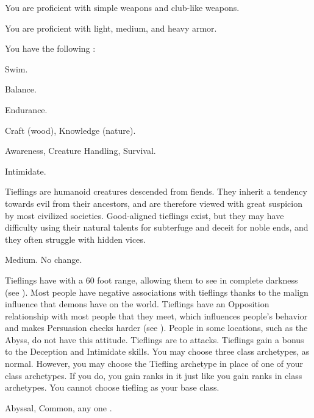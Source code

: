       You are proficient with simple weapons and club-like weapons.

      You are proficient with light, medium, and heavy armor.

      You have the following :
      \begin{raggeditemize}
        \item {} Swim.
        \item {} Balance.
        \item {} Endurance.
        \item {} Craft (wood), Knowledge (nature).
        \item {} Awareness, Creature Handling, Survival.
        \item {} Intimidate.
      \end{raggeditemize}


  Tieflings are humanoid creatures descended from fiends.
  They inherit a tendency towards evil from their ancestors, and are therefore viewed with great suspicion by most civilized societies.
  Good-aligned tieflings exist, but they may have difficulty using their natural talents for subterfuge and deceit for noble ends, and they often struggle with hidden vices.

   Medium.
   No change.
  \begin{raggeditemize}
     Tieflings have  with a 60 foot range, allowing them to see in complete darkness (see ).
     Most people have negative associations with tieflings thanks to the malign influence that demons have on the world.
      Tieflings have an Opposition relationship with most people that they meet, which influences people's behavior and makes Persuasion checks harder (see ).
      People in some locations, such as the Abyss, do not have this attitude.
     Tieflings are  to \atFire attacks.
     Tieflings gain a  bonus to the Deception and Intimidate skills.
     You may choose three class archetypes, as normal.
      However, you may choose the Tiefling archetype in place of one of your class archetypes.
      If you do, you gain ranks in it just like you gain ranks in class archetypes.
      You cannot choose tiefling as your base class.
  \end{raggeditemize}
   Abyssal, Common, any one .

